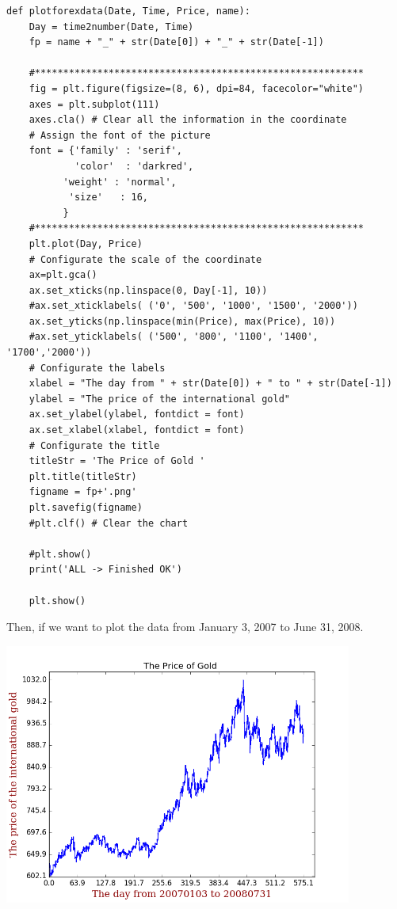 \documentclass[12pt]{article}
\begin{document}
\begin{lstlisting}
def plotforexdata(Date, Time, Price, name):
    Day = time2number(Date, Time)
    fp = name + "_" + str(Date[0]) + "_" + str(Date[-1])

    #**********************************************************
    fig = plt.figure(figsize=(8, 6), dpi=84, facecolor="white")
    axes = plt.subplot(111)
    axes.cla() # Clear all the information in the coordinate
    # Assign the font of the picture
    font = {'family' : 'serif',
            'color'  : 'darkred',
          'weight' : 'normal',
           'size'   : 16,
          }
    #**********************************************************
    plt.plot(Day, Price)
    # Configurate the scale of the coordinate
    ax=plt.gca()
    ax.set_xticks(np.linspace(0, Day[-1], 10))
    #ax.set_xticklabels( ('0', '500', '1000', '1500', '2000'))
    ax.set_yticks(np.linspace(min(Price), max(Price), 10))
    #ax.set_yticklabels( ('500', '800', '1100', '1400', '1700','2000'))
    # Configurate the labels
    xlabel = "The day from " + str(Date[0]) + " to " + str(Date[-1])
    ylabel = "The price of the international gold"
    ax.set_ylabel(ylabel, fontdict = font)
    ax.set_xlabel(xlabel, fontdict = font)
    # Configurate the title
    titleStr = 'The Price of Gold '
    plt.title(titleStr)
    figname = fp+'.png'
    plt.savefig(figname)
    #plt.clf() # Clear the chart

    #plt.show()
    print('ALL -> Finished OK')

    plt.show()
\end{lstlisting}

Then, if we want to plot the data from January 3, 2007 to June 31, 2008.

\includegraphics[width = 4.5in]{3.png}
\end{document}
